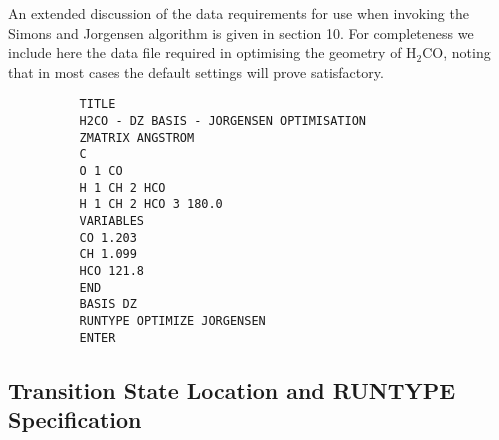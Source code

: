 \documentclass[11pt,fleqn]{article}
\newcommand{\formaldehyde}{\mbox{H$_{2}$CO}}
\begin{document}
An extended discussion of the data requirements for use
when invoking the Simons and Jorgensen algorithm is
given in section 10. For completeness we include here
the data file required in optimising the geometry of
\formaldehyde, noting that in most cases the
default settings will prove satisfactory.

{
\footnotesize
\begin{verbatim}
          TITLE
          H2CO - DZ BASIS - JORGENSEN OPTIMISATION
          ZMATRIX ANGSTROM
          C
          O 1 CO
          H 1 CH 2 HCO
          H 1 CH 2 HCO 3 180.0
          VARIABLES
          CO 1.203
          CH 1.099
          HCO 121.8
          END
          BASIS DZ
          RUNTYPE OPTIMIZE JORGENSEN
          ENTER
\end{verbatim}
}

\subsection[Transition State Location and RUNTYPE Specification]{Transition State Location and RUNTYPE Specification}
\end{document}
